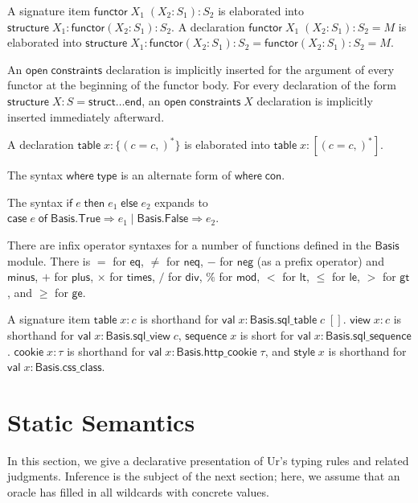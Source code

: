 \documentclass{article}
\newcommand{\mt}[1]{\mathsf{#1}}
\begin{document}
A signature item $\mt{functor} \; X_1 \; (X_2 : S_1) : S_2$ is elaborated into $\mt{structure} \; X_1 : \mt{functor}(X_2 : S_1) : S_2$.  A declaration $\mt{functor} \; X_1 \; (X_2 : S_1) : S_2 = M$ is elaborated into $\mt{structure} \; X_1 : \mt{functor}(X_2 : S_1) : S_2 = \mt{functor}(X_2 : S_1) : S_2 = M$.

An $\mt{open} \; \mt{constraints}$ declaration is implicitly inserted for the argument of every functor at the beginning of the functor body.  For every declaration of the form $\mt{structure} \; X : S = \mt{struct} \ldots \mt{end}$, an $\mt{open} \; \mt{constraints} \; X$ declaration is implicitly inserted immediately afterward.

A declaration $\mt{table} \; x : \{(c = c,)^*\}$ is elaborated into $\mt{table} \; x : [(c = c,)^*]$.

The syntax $\mt{where} \; \mt{type}$ is an alternate form of $\mt{where} \; \mt{con}$.

The syntax $\mt{if} \; e \; \mt{then} \; e_1 \; \mt{else} \; e_2$ expands to $\mt{case} \; e \; \mt{of} \; \mt{Basis}.\mt{True} \Rightarrow e_1 \mid \mt{Basis}.\mt{False} \Rightarrow e_2$.

There are infix operator syntaxes for a number of functions defined in the $\mt{Basis}$ module.  There is $=$ for $\mt{eq}$, $\neq$ for $\mt{neq}$, $-$ for $\mt{neg}$ (as a prefix operator) and $\mt{minus}$, $+$ for $\mt{plus}$, $\times$ for $\mt{times}$, $/$ for $\mt{div}$, $\%$ for $\mt{mod}$, $<$ for $\mt{lt}$, $\leq$ for $\mt{le}$, $>$ for $\mt{gt}$, and $\geq$ for $\mt{ge}$.

A signature item $\mt{table} \; x : c$ is shorthand for $\mt{val} \; x : \mt{Basis}.\mt{sql\_table} \; c \; []$.  $\mt{view} \; x : c$ is shorthand for $\mt{val} \; x : \mt{Basis}.\mt{sql\_view} \; c$, $\mt{sequence} \; x$ is short for $\mt{val} \; x : \mt{Basis}.\mt{sql\_sequence}$.  $\mt{cookie} \; x : \tau$ is shorthand for $\mt{val} \; x : \mt{Basis}.\mt{http\_cookie} \; \tau$, and $\mt{style} \; x$ is shorthand for $\mt{val} \; x : \mt{Basis}.\mt{css\_class}$.


\section{Static Semantics}

In this section, we give a declarative presentation of Ur's typing rules and related judgments.  Inference is the subject of the next section; here, we assume that an oracle has filled in all wildcards with concrete values.
\end{document}
